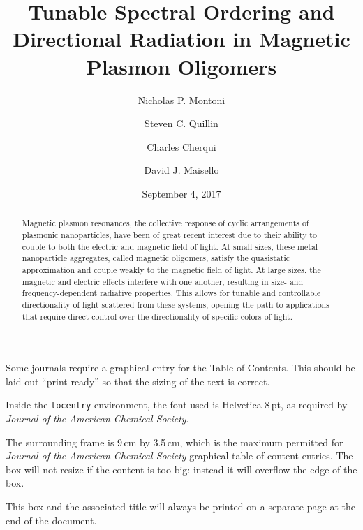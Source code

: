 \documentclass[journal=apchd5,manuscript=article]{achemso}
\author{Nicholas P. Montoni}
\author{Steven C. Quillin}
\author{Charles Cherqui}
\author{David J. Maisello}
\affiliation[Department of Chemistry, University of Washington]
{Department of Chemistry, University of Washington, Seattle, WA 98195}
\date{September 4, 2017}
\title[]
    {Tunable Spectral Ordering and Directional Radiation in Magnetic Plasmon Oligomers}
\begin{document}
\begin{tocentry}

Some journals require a graphical entry for the Table of Contents.
This should be laid out ``print ready'' so that the sizing of the
text is correct.

Inside the \texttt{tocentry} environment, the font used is Helvetica
8\,pt, as required by \emph{Journal of the American Chemical
Society}.

The surrounding frame is 9\,cm by 3.5\,cm, which is the maximum
permitted for  \emph{Journal of the American Chemical Society}
graphical table of content entries. The box will not resize if the
content is too big: instead it will overflow the edge of the box.

This box and the associated title will always be printed on a
separate page at the end of the document.

\end{tocentry}

\begin{abstract}
Magnetic plasmon resonances, the collective response of cyclic arrangements of plasmonic nanoparticles, have been of great recent interest due to their ability to couple to both the electric and magnetic field of light. At small sizes, these metal nanoparticle aggregates, called magnetic oligomers, satisfy the quasistatic approximation and couple weakly to the magnetic field of light. At large sizes, the magnetic and electric effects interfere with one another, resulting in size- and frequency-dependent radiative properties. This allows for tunable and controllable directionality of light scattered from these systems, opening the path to applications that require direct control over the directionality of specific colors of light.
\end{abstract}

\end{document}
